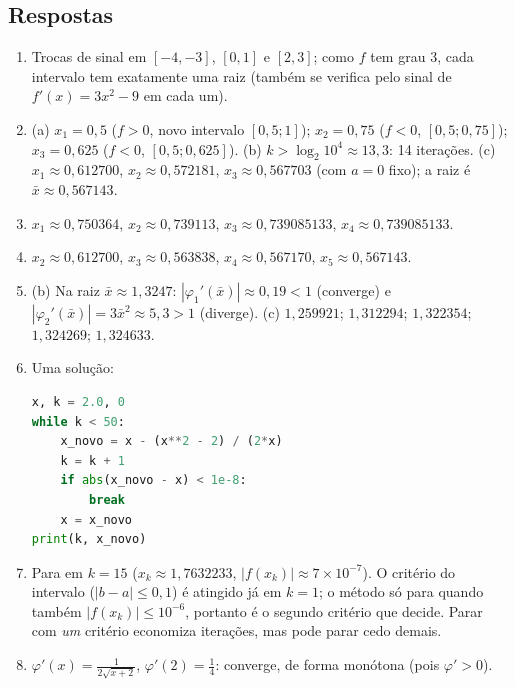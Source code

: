 \subsection*{Respostas}
\begin{enumerate}[label=\textbf{\arabic*.},leftmargin=*,nosep]
\item Trocas de sinal em $[-4,-3]$, $[0,1]$ e $[2,3]$; como $f$ tem grau 3, cada intervalo tem
  exatamente uma raiz (também se verifica pelo sinal de $f'(x)=3x^2-9$ em cada um).
\item (a) $x_1=0{,}5$ ($f>0$, novo intervalo $[0{,}5;1]$); $x_2=0{,}75$ ($f<0$, $[0{,}5;0{,}75]$);
  $x_3=0{,}625$ ($f<0$, $[0{,}5;0{,}625]$). (b) $k>\log_2 10^4\approx13{,}3$: 14 iterações.
  (c) $x_1\approx0{,}612700$, $x_2\approx0{,}572181$, $x_3\approx0{,}567703$ (com $a=0$ fixo);
  a raiz é $\bar x\approx0{,}567143$.
\item $x_1\approx0{,}750364$, $x_2\approx0{,}739113$, $x_3\approx0{,}739085133$,
  $x_4\approx0{,}739085133$.
\item $x_2\approx0{,}612700$, $x_3\approx0{,}563838$, $x_4\approx0{,}567170$, $x_5\approx0{,}567143$.
\item (b) Na raiz $\bar x\approx1{,}3247$: $|\varphi_1'(\bar x)|\approx0{,}19<1$ (converge) e
  $|\varphi_2'(\bar x)|=3\bar x^2\approx5{,}3>1$ (diverge). (c) $1{,}259921$; $1{,}312294$;
  $1{,}322354$; $1{,}324269$; $1{,}324633$.
\item Uma solução:
\begin{lstlisting}[language=Python]
x, k = 2.0, 0
while k < 50:
    x_novo = x - (x**2 - 2) / (2*x)
    k = k + 1
    if abs(x_novo - x) < 1e-8:
        break
    x = x_novo
print(k, x_novo)
\end{lstlisting}
\item Para em $k=15$ ($x_k\approx1{,}7632233$, $|f(x_k)|\approx7\times10^{-7}$). O critério
  do intervalo ($|b-a|\le0{,}1$) é atingido já em $k=1$; o método só para quando também
  $|f(x_k)|\le10^{-6}$, portanto é o segundo critério que decide. Parar com \emph{um} critério
  economiza iterações, mas pode parar cedo demais.
\item $\varphi'(x)=\frac{1}{2\sqrt{x+2}}$, $\varphi'(2)=\frac14$: converge, de forma monótona
  (pois $\varphi'>0$).
\end{enumerate}

